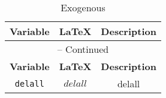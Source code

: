 \begin{center}
\begin{longtable}{ccc}
\caption{Exogenous}\\%
\hline%
\multicolumn{1}{c}{\textbf{Variable}} &
\multicolumn{1}{c}{\textbf{\LaTeX}} &
\multicolumn{1}{c}{\textbf{Description}}\\%
\hline\hline%
\endfirsthead
\multicolumn{3}{c}{{\tablename} \thetable{} -- Continued}\\%
\hline%
\multicolumn{1}{c}{\textbf{Variable}} &
\multicolumn{1}{c}{\textbf{\LaTeX}} &
\multicolumn{1}{c}{\textbf{Description}}\\%
\hline\hline%
\endhead
\texttt{delall} & $delall$ & delall\\
\hline%
\end{longtable}
\end{center}
